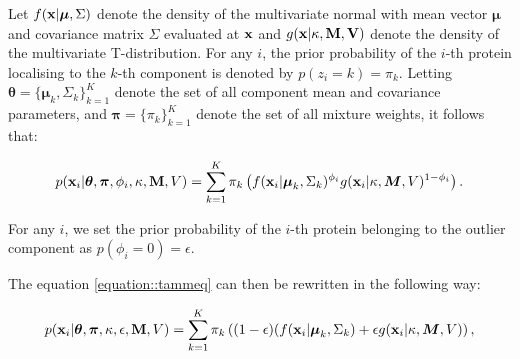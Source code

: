\documentclass[12pt,english]{article}
\begin{document}
Let  $f({\bf x} | \boldsymbol{\mu}, \Sigma)$ denote the density of
the multivariate normal with mean vector $\boldsymbol{\mu}$ and
covariance matrix $\Sigma$ evaluated at ${\bf x}$ and $g({\bf x | \kappa, \bf{M}, V} )$ denote the density of the multivariate T-distribution. For any $i$, the prior probability of the $i$-th protein localising to the $k$-th component is denoted by $p(z_i = k) = \pi_k$. Letting
$\boldsymbol{\theta} = \{\boldsymbol{\mu}_k, \Sigma_k \}_{k = 1}^K$
denote the set of all component mean and covariance parameters, and
$\boldsymbol{\pi} = \{\pi_k\}_{k = 1}^K$ denote the set of all mixture
weights, it follows that:

\begin{equation} \label{equation::tammeq}
\begin{split}
p({\bf x}_i| \boldsymbol{\theta}, \boldsymbol{\pi} ,\phi_i, \kappa, {\bf M}, V) &=  \sum_{k=1}^{K}\pi_k\left(f({\bf x}_i|\boldsymbol{\mu}_k, \Sigma_k)^{\phi_i}g({\bf x}_i|\kappa, \boldsymbol{M}, V)^{1 - \phi_i }\right).\\
\end{split}
\end{equation}

For any $i$, we set the prior probability of the $i$-th protein
belonging to the outlier component as $p(\phi_i = 0) = \epsilon$.

The equation \eqref{equation::tammeq}  can then be rewritten in the following way:

\begin{equation}\label{equation::tammepseq}
\begin{split}
p({\bf x}_i| \boldsymbol{\theta}, \boldsymbol{\pi} , \kappa, \epsilon, {\bf M}, V) &=  \sum_{k=1}^{K}\pi_k\left((1-\epsilon)(f({\bf x}_i |\boldsymbol{\mu}_k, \Sigma_k) + \epsilon g({\bf x}_i|\kappa, \boldsymbol{M}, V)\right),\\
\end{split}
\end{equation}
\end{document}
